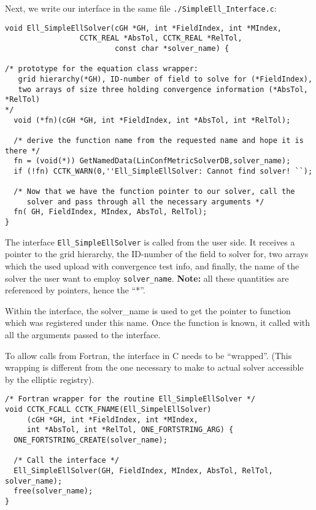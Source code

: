 \documentclass{article}
\begin{document}
\begin{itemize}
Next, we write our interface in the same file {\tt ./SimpleEll\_Interface.c}:
\begin{verbatim}
void Ell_SimpleEllSolver(cGH *GH, int *FieldIndex, int *MIndex, 
		         CCTK_REAL *AbsTol, CCTK_REAL *RelTol,
                         const char *solver_name) {

/* prototype for the equation class wrapper:
   grid hierarchy(*GH), ID-number of field to solve for (*FieldIndex),
   two arrays of size three holding convergence information (*AbsTol, *RelTol)
*/
  void (*fn)(cGH *GH, int *FieldIndex, int *AbsTol, int *RelTol);

  /* derive the function name from the requested name and hope it is there */
  fn = (void(*)) GetNamedData(LinConfMetricSolverDB,solver_name);
  if (!fn) CCTK_WARN(0,''Ell_SimpleEllSolver: Cannot find solver! ``);

  /* Now that we have the function pointer to our solver, call the 
     solver and pass through all the necessary arguments */
  fn( GH, FieldIndex, MIndex, AbsTol, RelTol);
}

\end{verbatim}
The interface {\tt Ell\_SimpleEllSolver} is called from the user side. It receives a pointer to the grid hierarchy, the ID-number of the field to solver for, two arrays which the used upload with convergence test info, and finally, the name of the solver the user want to employ {\tt *solver\_name}. {\bf Note:} all these quantities are referenced by pointers, hence the ``*''.

Within the interface, the solver\_name is used to get the pointer to function which was registered under this name.
Once the function is known, it called with all the arguments passed to 
the interface.

To allow calls from Fortran, the interface in C needs to be ``wrapped''. 
(This wrapping  is different from the one necessary to make to actual solver 
accessible by the elliptic registry).

\begin{verbatim}
/* Fortran wrapper for the routine Ell_SimpleEllSolver */
void CCTK_FCALL CCTK_FNAME(Ell_SimpelEllSolver)
     (cGH *GH, int *FieldIndex, int *MIndex, 
     int *AbsTol, int *RelTol, ONE_FORTSTRING_ARG) {
  ONE_FORTSTRING_CREATE(solver_name);

  /* Call the interface */
  Ell_SimpleEllSolver(GH, FieldIndex, MIndex, AbsTol, RelTol, solver_name);
  free(solver_name);
}
\end{verbatim}


\end{itemize}
\end{document}
